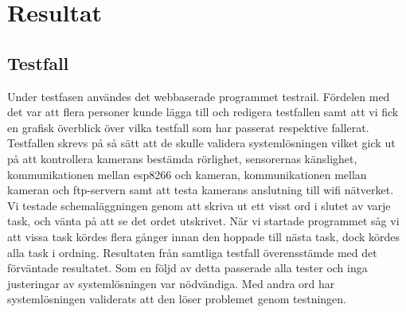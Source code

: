 

\chapter{Resultat} %
\label{ch:resultat}


\ifpdf
    \graphicspath{{6/figures/PNG/}{6/figures/PDF/}{6/figures/}}
\else
    \graphicspath{{6/figures/EPS/}{6/figures/}}
\fi



\section{Testfall}

Under testfasen användes det webbaserade programmet testrail. Fördelen med det var att flera personer kunde lägga till och redigera testfallen samt att vi fick en grafisk överblick över vilka testfall som har passerat respektive fallerat. 
Testfallen skrevs på så sätt att de skulle validera systemlösningen vilket gick ut på att kontrollera kamerans bestämda rörlighet, sensorernas känslighet, kommunikationen mellan esp8266 och kameran, kommunikationen mellan kameran och ftp-servern samt att testa kamerans anslutning till wifi nätverket.
Vi testade schemaläggningen genom att skriva ut ett visst ord i slutet av varje task, och vänta på att se det ordet utskrivet. När vi startade programmet såg vi att vissa task kördes flera gånger innan den hoppade till nästa task, dock kördes alla task i ordning. 
Resultaten från samtliga testfall överensstämde med det förväntade resultatet. Som en följd av detta passerade alla tester och inga justeringar av systemlösningen var nödvändiga. Med andra ord har systemlösningen validerats att den löser problemet genom testningen.




